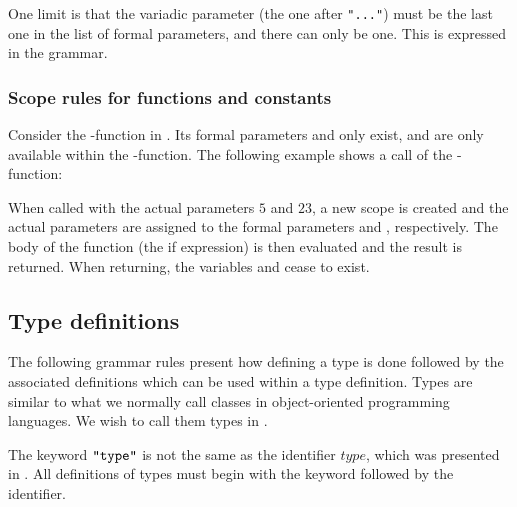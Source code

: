 
One limit is that the variadic parameter (the one after \texttt{"..."}) must be
the last one in the list of formal parameters, and there can only be one. This
is expressed in the grammar.

\subsubsection{Scope rules for functions and constants}

Consider the -function in . Its formal
parameters  and  only exist, and are only available
within the -function. The following example shows a call of the
-function:


When called with the actual parameters $5$ and $23$, a new scope is created and
the actual parameters are assigned to the formal parameters  and
, respectively. The body of the function (the if expression) is then
evaluated and the result is returned. When returning, the variables
 and  cease to exist. 

\subsection{Type definitions}
\label{sec:typedefinitions}

The following grammar rules present how defining a type is done followed by the
associated definitions which can be used within a type definition. Types are
similar to what we normally call classes in object-oriented programming
languages. We wish to call them types in \productname{}.

\begin{ebnf}
 
\end{ebnf}

The keyword $\texttt{"type"}$ is not the same as the identifier $type$, which was
presented in . All definitions of types must begin with
the keyword followed by the identifier.

